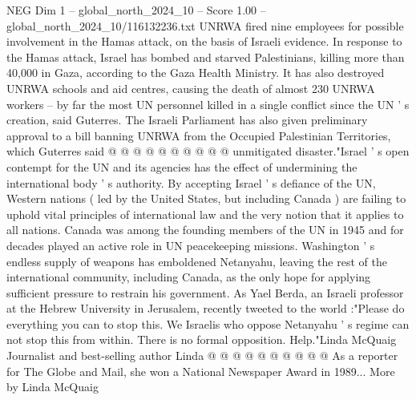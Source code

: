 \begin{textsample}{NEG Dim 1 – global\_north\_2024\_10 – Score 1.00 – global\_north\_2024\_10/116132236.txt}
UNRWA fired nine employees for possible involvement in the Hamas attack, on the basis of Israeli evidence.
In response to the Hamas attack, Israel has bombed and starved Palestinians, killing more than 40,000 in Gaza, according to the Gaza Health Ministry.
It has also destroyed UNRWA schools and aid centres, causing the death of almost 230 UNRWA workers -- by far the most UN personnel killed in a single conflict since the UN ' s creation, said Guterres.
The Israeli Parliament has also given preliminary approval to a bill banning UNRWA from the Occupied Palestinian Territories, which Guterres said @ @ @ @ @ @ @ @ @ @ unmitigated disaster."Israel ' s open contempt for the UN and its agencies has the effect of undermining the international body ' s authority.
By accepting Israel ' s defiance of the UN, Western nations ( led by the United States, but including Canada ) are failing to uphold vital principles of international law and the very notion that it applies to all nations.
Canada was among the founding members of the UN in 1945 and for decades played an active role in UN peacekeeping missions.
Washington ' s endless supply of weapons has emboldened Netanyahu, leaving the rest of the international community, including Canada, as the only hope for applying sufficient pressure to restrain his government.
As Yael Berda, an Israeli professor at the Hebrew University in Jerusalem, recently tweeted to the world :"Please do everything you can to stop this.
We Israelis who oppose Netanyahu ' s regime can not stop this from within.
There is no formal opposition.
Help."Linda McQuaig Journalist and best-selling author Linda @ @ @ @ @ @ @ @ @ @ As a reporter for The Globe and Mail, she won a National Newspaper Award in 1989...
More by Linda McQuaig

\end{textsample}
